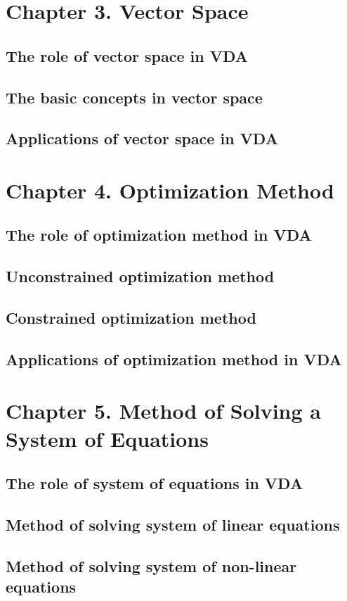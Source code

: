 \section{Chapter 3. Vector Space}
\subsection{The role of vector space in VDA}
\subsection{The basic concepts in vector space}
\subsection{Applications of vector space in VDA}

\section{Chapter 4. Optimization Method}
\subsection{The role of optimization method in VDA}
\subsection{Unconstrained optimization method}
\subsection{Constrained optimization method}
\subsection{Applications of optimization method in VDA}

\section{Chapter 5. Method of Solving a System of Equations}
\subsection{The role of system of equations in VDA}
\subsection{Method of solving system of linear equations}
\subsection{Method of solving system of non-linear equations}
